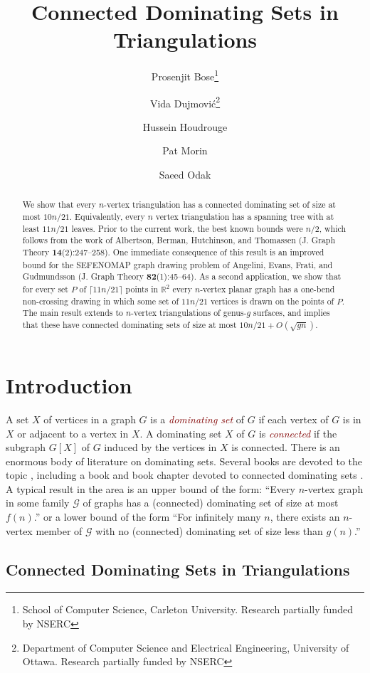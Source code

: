 \documentclass{article}
\title{Connected Dominating Sets in Triangulations}
\author{%
  Prosenjit Bose\thanks{School of Computer Science, Carleton University. Research partially funded by NSERC} \and
  Vida Dujmović\thanks{Department of Computer Science and Electrical Engineering, University of Ottawa. Research partially funded by NSERC}\and
  Hussein Houdrouge\footnotemark[1] \and
  Pat Morin\footnotemark[1] \and
  Saeed Odak\footnotemark[2]}
\date{}
\newcommand{\R}{\mathbb{R}}
\newcommand{\defin}[1]{\emph{\textcolor{Maroon}{#1}}}
\theoremstyle{definition}
\begin{document}
\maketitle

\begin{abstract}
  We show that every $n$-vertex triangulation has a connected dominating set of size at most $10n/21$.  Equivalently, every $n$ vertex triangulation has a spanning tree with at least $11n/21$ leaves. Prior to the current work, the best known bounds were $n/2$, which follows from the work of Albertson, Berman, Hutchinson, and Thomassen (J. Graph Theory \textbf{14}(2):247--258). One immediate consequence of this result is an improved bound for the SEFENOMAP graph drawing problem of Angelini, Evans, Frati, and Gudmundsson (J. Graph Theory \textbf{82}(1):45--64).  As a second application, we show that for every set $P$ of $\lceil 11n/21\rceil$ points in $\R^2$ every $n$-vertex planar graph has a one-bend non-crossing drawing in which some set of  $11n/21$ vertices is drawn on the points of $P$.  The main result extends to $n$-vertex triangulations of genus-$g$ surfaces, and implies that these have connected dominating sets of size at most $10n/21+O(\sqrt{gn})$.
\end{abstract}


\section{Introduction}

A set $X$ of vertices in a graph $G$ is a \defin{dominating set} of $G$ if each vertex of $G$ is in $X$ or adjacent to a vertex in $X$.  A dominating set $X$ of $G$ is \defin{connected} if the subgraph $G[X]$ of $G$ induced by the vertices in $X$ is connected.  There is an enormous body of literature on dominating sets. Several books are devoted to the topic \cite{haynes.hedetniemi.ea:domination,haynes.hedetniemi.ea:topics,du.wan:connected,haynes.hedetniemi.ea:vol2}, including a book and book chapter devoted to connected dominating sets \cite{du.wan:connected,chellali.favaron:connected}.  A typical result in the area is an upper bound of the form: ``Every $n$-vertex graph in some family $\mathcal{G}$ of graphs has a (connected) dominating set of size at most $f(n)$.'' or a lower bound of the form ``For infinitely many $n$, there exists an $n$-vertex member of $\mathcal{G}$ with no (connected) dominating set of size less than $g(n)$.''

\subsection{Connected Dominating Sets in Triangulations}
\end{document}
